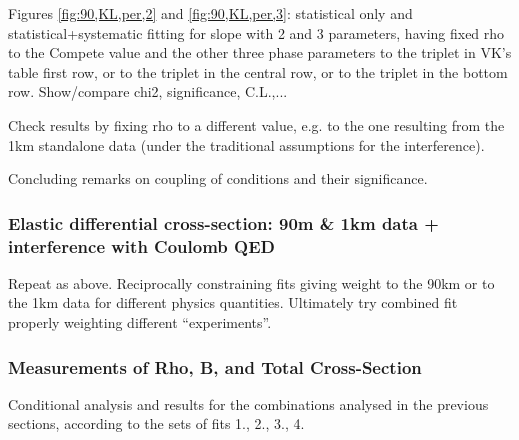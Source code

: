Figures \ref{fig:90,KL,per,2} and \ref{fig:90,KL,per,3}:
statistical only and statistical+systematic fitting for slope with 2 and 3 parameters,
having fixed rho to the Compete value and the other three phase parameters to the triplet
in VK’s table first row, or to the triplet in the central row, or to the triplet in the
bottom row. Show/compare chi2, significance, C.L.,...

Check results by fixing rho to a different value, e.g. to the one resulting from the 1km
standalone data (under the traditional assumptions for the interference).

Concluding remarks on coupling of conditions and their significance.


\subsubsection{Elastic differential cross-section: 90m \& 1km data + interference with Coulomb QED}

Repeat as above. Reciprocally constraining fits giving weight to the 90km or to the 1km data
for different physics quantities. Ultimately try combined fit properly weighting different
“experiments”.


\subsubsection{Measurements of Rho, B, and Total Cross-Section}

Conditional analysis and results for the combinations analysed in the previous sections,
according to the sets of fits 1., 2., 3., 4.
